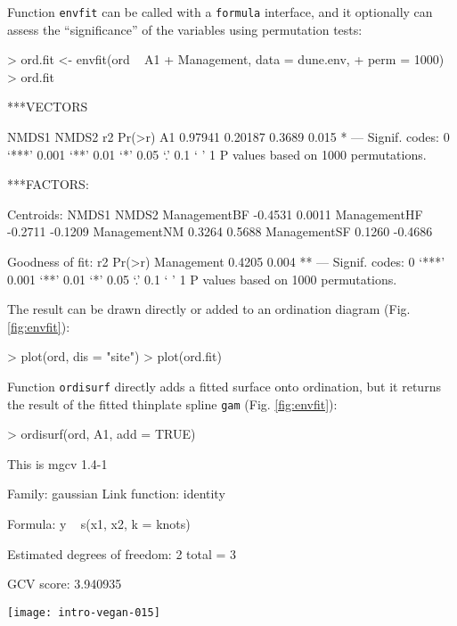 \documentclass[a4paper,10pt]{amsart}
\begin{document}
Function \texttt{envfit} can be called with a \texttt{formula}
interface, and it optionally can assess the ``significance'' of the
variables using permutation tests:
\begin{Schunk}
\begin{Sinput}
> ord.fit <- envfit(ord ~ A1 + Management, data = dune.env, 
+     perm = 1000)
> ord.fit
\end{Sinput}
\begin{Soutput}
***VECTORS

     NMDS1   NMDS2     r2 Pr(>r)  
A1 0.97941 0.20187 0.3689  0.015 *
---
Signif. codes:  0 ‘***’ 0.001 ‘**’ 0.01 ‘*’ 0.05 ‘.’ 0.1 ‘ ’ 1 
P values based on 1000 permutations.

***FACTORS:

Centroids:
               NMDS1   NMDS2
ManagementBF -0.4531  0.0011
ManagementHF -0.2711 -0.1209
ManagementNM  0.3264  0.5688
ManagementSF  0.1260 -0.4686

Goodness of fit:
               r2 Pr(>r)   
Management 0.4205  0.004 **
---
Signif. codes:  0 ‘***’ 0.001 ‘**’ 0.01 ‘*’ 0.05 ‘.’ 0.1 ‘ ’ 1 
P values based on 1000 permutations.
\end{Soutput}
\end{Schunk}
The result can be drawn directly or added to an ordination diagram
(Fig. \ref{fig:envfit}):
\begin{Schunk}
\begin{Sinput}
> plot(ord, dis = "site")
> plot(ord.fit)
\end{Sinput}
\end{Schunk}

Function \texttt{ordisurf} directly adds a fitted surface onto
ordination, but it returns the result of the fitted thinplate spline
\texttt{gam} (Fig. \ref{fig:envfit}):
\begin{Schunk}
\begin{Sinput}
> ordisurf(ord, A1, add = TRUE)
\end{Sinput}
\begin{Soutput}
This is mgcv 1.4-1 

Family: gaussian 
Link function: identity 

Formula:
y ~ s(x1, x2, k = knots)

Estimated degrees of freedom:
 2   total =  3 

GCV score:  3.940935 
\end{Soutput}
\end{Schunk}
\begin{SCfigure}
\texttt{[image: intro-vegan-015]}
\caption{Fitted vector and smooth surface for the thickness of A1
  horizon (\texttt{A1}, in cm), and centroids of Management levels.}
\label{fig:envfit}
\end{SCfigure}
\end{document}
